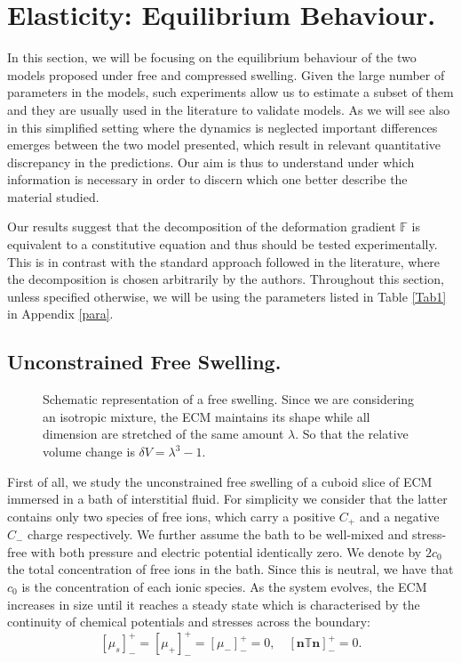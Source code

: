 \documentclass[runningheads]{llncs}
\newcommand{\F}{\ensuremath{\mathbb{F}}}
\begin{document}

\section{Elasticity: Equilibrium Behaviour.}
\label{eqtest}
In this section, we will be focusing on the equilibrium behaviour of the two models proposed under free and compressed swelling. Given the large number of parameters in the models, such experiments allow us to estimate a subset of them and they are usually used in the literature to validate models. As we will see also in this simplified setting where the dynamics is neglected important differences emerges between the two model presented, which result in relevant quantitative discrepancy in the predictions. Our aim is thus to understand under which information is necessary in order to discern which one better describe the material studied. 

Our results suggest that the decomposition of the deformation gradient $\F$ is equivalent to a constitutive equation and thus should be tested experimentally. This is in contrast with the standard approach followed in the literature, where the decomposition is chosen arbitrarily by the authors. 
Throughout this section, unless specified otherwise, we will be using the parameters listed in Table \ref{Tab1} in Appendix \ref{para}.

\subsection{Unconstrained Free Swelling.} 
\label{free}
\begin{figure}
	\centering
	\def\svgwidth{0.95\linewidth}
	
	\caption{Schematic representation of a free swelling. Since we are considering an isotropic mixture, the ECM maintains its shape while all dimension are stretched of the same amount $\lambda$. So that the relative volume change is $\delta V = \lambda^3-1$. }
\end{figure}

First of all, we study the unconstrained free swelling of a cuboid slice of ECM immersed in a bath of interstitial fluid. For simplicity we consider that the latter contains only two species of free ions, which carry a positive $C_+$ and a negative $C_-$ charge respectively. We further assume the bath to be well-mixed and stress-free with both pressure and electric potential identically zero. We denote by $2c_0$ the total concentration of free ions in the bath. Since this is neutral, we have that $c_0$ is the concentration of each ionic species. As the system evolves, the ECM increases in size until it reaches a steady state which is characterised by the continuity of chemical potentials and stresses across the boundary:
\begin{equation}
\left[\mu_s\right]^+_-=\left[\mu_+\right]^+_-=\left[\mu_-\right]^+_-=0, \quad \left[\mathbf{n} \mathbb{T}\mathbf{n}\right]^+_-=0.
\end{equation}
\end{document}
